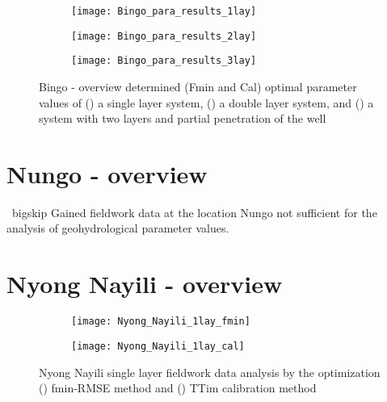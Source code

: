 \begin{figure}[h!]
	\centering
	\begin{subfigure}[b]{\linewidth}
		\centering\texttt{[image: Bingo\_para\_results\_1lay]}
		\captionsetup{justification=centering}		
		\caption{\label{fig:Bingo_para_results_1lay}}
		\end{subfigure}\vfill
	\begin{subfigure}[b]{\linewidth}
		\centering\texttt{[image: Bingo\_para\_results\_2lay]}
		\captionsetup{justification=centering}		
		\caption{\label{fig:Bingo_para_results_2lay}}
		\end{subfigure}
	\begin{subfigure}[b]{\linewidth}
		\centering\texttt{[image: Bingo\_para\_results\_3lay]}
		\captionsetup{justification=centering}		
		\caption{\label{fig:Bingo_para_results_3lay}}
		\end{subfigure}		
	\captionsetup{justification=centering}	
	\caption{Bingo - overview determined (Fmin and Cal) optimal parameter values of () a single layer system, () a double layer system, and () a system with two layers and partial penetration of the well} 
	\label{fig:Bingo_para_results}
\end{figure} 


\clearpage\section{Nungo - overview}
\label{sec:Nungo_overview}
\ bigskip 
Gained fieldwork data at the location Nungo not sufficient for the analysis of geohydrological parameter values.  

\clearpage\section{Nyong Nayili - overview}
\label{sec:Nyong_Nayili_overview}

\begin{figure}[h!]
	\centering
	\begin{subfigure}[b]{0.65\linewidth}
		\centering\texttt{[image: Nyong\_Nayili\_1lay\_fmin]}
		\captionsetup{justification=centering}		
		\caption{\label{fig:Nyong_Nayili_1lay_fmin}}
		\end{subfigure}\vfill
	\begin{subfigure}[b]{0.65\linewidth}
		\centering\texttt{[image: Nyong\_Nayili\_1lay\_cal]}
		\captionsetup{justification=centering}		
		\caption{\label{fig:Nyong_Nayili_1lay_cal}}
		\end{subfigure}
	\captionsetup{justification=centering}	
	\caption{Nyong Nayili single layer fieldwork data analysis by the optimization () fmin-RMSE method and () TTim calibration method} 
	\label{fig:Nyong_Nayili_1lay_analysis}
\end{figure} 

